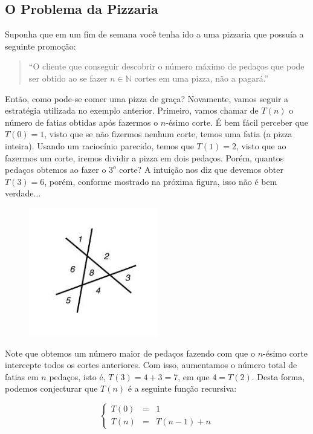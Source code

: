 \subsection{O Problema da Pizzaria}

Suponha que em um fim de semana você tenha ido a uma pizzaria que
possuía a seguinte promoção:

\begin{quote}
``O cliente que conseguir descobrir o número máximo de pedaços que pode
ser obtido ao se fazer $n \in \mathbb{N}$ cortes em uma pizza, não a pagará.''
\end{quote}

Então, como pode-se comer uma pizza de graça? Novamente, vamos seguir
a estratégia utilizada no exemplo anterior. Primeiro, vamos chamar de
$T(n)$ o número de fatias obtidas após fazermos o $n$-ésimo corte. É
bem fácil perceber que $T(0) = 1$, visto que se não fizermos nenhum
corte, temos uma fatia (a pizza inteira). Usando um raciocínio
parecido, temos que $T(1) = 2$, visto que ao fazermos um corte, iremos
dividir a pizza em dois pedaços. Porém, quantos pedaços obtemos ao
fazer o $3^o$ corte? A intuição nos diz que devemos obter $T(3) = 6$,
porém, conforme mostrado na próxima figura, isso não é bem verdade...

\begin{figure}[H]
  \centering
      \includegraphics[width=0.5\textwidth]{imagens/plane.jpg}
 \end{figure}

Note que obtemos um número maior de pedaços fazendo com que o
$n$-ésimo corte intercepte todos os cortes anteriores. Com isso,
aumentamos o número total de fatias em $n$ pedaços, isto é, $T(3) = 4
+ 3 = 7$, em que $4 = T(2)$. Desta forma, podemos conjecturar que
$T(n)$ é a seguinte função recursiva:

\[
\left\{
\begin{array}{lcl}
  T(0) & = & 1 \\
  T(n) & = & T(n - 1) + n
\end{array}
\right.
\]

